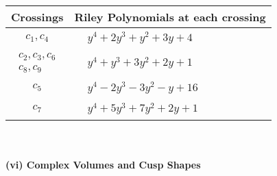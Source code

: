 \documentclass[1p]{elsarticle_modified}
\theoremstyle{definition}
\begin{document}
\begin{tabular}{m{50pt}|m{274pt}}
Crossings & \hspace{64pt}Riley Polynomials at each crossing \\
\hline $$\begin{aligned}c_{1},c_{4}\end{aligned}$$&$\begin{aligned}
&y^4+2 y^3+y^2+3 y+4
\end{aligned}$\\
\hline $$\begin{aligned}c_{2},c_{3},c_{6}\\c_{8},c_{9}\end{aligned}$$&$\begin{aligned}
&y^4+y^3+3 y^2+2 y+1
\end{aligned}$\\
\hline $$\begin{aligned}c_{5}\end{aligned}$$&$\begin{aligned}
&y^4-2 y^3-3 y^2- y+16
\end{aligned}$\\
\hline $$\begin{aligned}c_{7}\end{aligned}$$&$\begin{aligned}
&y^4+5 y^3+7 y^2+2 y+1
\end{aligned}$\\
\hline
\end{tabular}\\~\\
\newpage\flushleft \textbf{(vi) Complex Volumes and Cusp Shapes}
\end{document}
